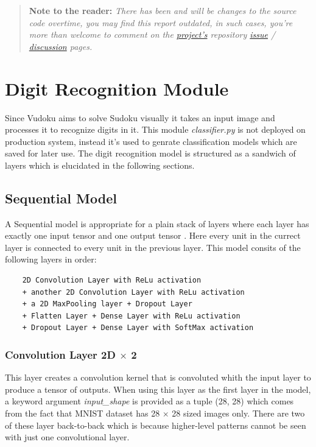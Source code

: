 \documentclass[12pt, a4paper]{report}
\begin{document}
\begin{quote}
    \textbf{Note to the reader:} \textit{There has been and will be changes to the source code overtime, you may find this report outdated, in such cases, you're more than welcome to comment on the \href{https://github.com/joe733/vudoku}{project's} repository \href{https://github.com/joe733/vudoku/issues}{issue} / \href{https://github.com/joe733/vudoku/discussions}{discussion} pages.}
\end{quote}

\section{Digit Recognition Module}
\label{sec:drm}
\hspace{0.5cm} Since Vudoku aims to solve Sudoku visually it takes an input image and processes it to recognize digits in it. This module \textit{classifier.py} is not deployed on production system, instead it's used to genrate classification models which are saved for later use. The digit recognition model is structured as a sandwich of layers which is elucidated in the following sections.

\subsection{Sequential Model}
\label{subsec:seqmod}

\hspace{0.5cm} A Sequential model is appropriate for a plain stack of layers where each layer has exactly one input tensor and one output tensor \cite{wpg:kerasseqmod}. Here every unit in the currect layer is connected to every unit in the previous layer. This model consits of the following layers in order:

\begin{lstlisting}
    2D Convolution Layer with ReLu activation
    + another 2D Convolution Layer with ReLu activation
    + a 2D MaxPooling layer + Dropout Layer
    + Flatten Layer + Dense Layer with ReLu activation
    + Dropout Layer + Dense Layer with SoftMax activation
\end{lstlisting}


\subsubsection{Convolution Layer 2D \texorpdfstring{$\times$}{x}  2} %
\label{subsubsec:convl2d2}
\hspace{0.5cm} This layer creates a convolution kernel that is convoluted whith the input layer to produce a tensor of outputs. When using this layer as the first layer in the model, a keyword argument \textit{input\_shape} is provided as a tuple (28, 28) which comes from the fact that MNIST dataset has 28 $\times$ 28 sized images only. There are two of these layer back-to-back which is because higher-level patterns cannot be seen with just one convolutional layer. 
\end{document}
